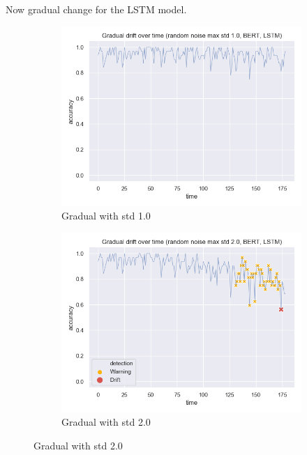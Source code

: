 \documentclass[12pt]{report}
\begin{document}
Now gradual change for the LSTM model.

\begin{figure}[H]
\centering
\begin{subfigure}{.5\textwidth}
  \centering
  \includegraphics[width=\linewidth]{assets/detecting-change/gradual_noise_random_std_1_lstm_wos_1_BERT.png}
  \caption{Gradual with std 1.0}
  \label{fig:lstm-gradual-std-1}
\end{subfigure}%
\begin{subfigure}{.5\textwidth}
  \centering
  \includegraphics[width=\linewidth]{assets/detecting-change/gradual_noise_random_std_2_lstm_wos_1_BERT.png}
  \caption{Gradual with std 2.0}
  \label{fig:lstm-gradual-std-2}
\end{subfigure}

\end{figure}
\end{document}
